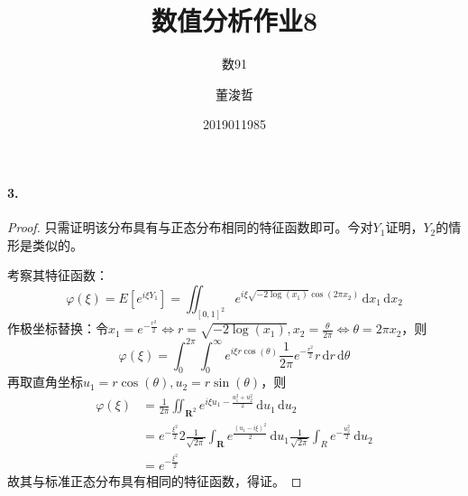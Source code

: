 \documentclass{ctexart}
\title{数值分析作业8}
\author{数91\and 董浚哲\and 2019011985}
\begin{document}
\newcommand{\R}{\mathbf{R}}
\newcommand{\dd}{\,\mathrm{d}}
\newcommand{\st}{\text{ s.t. }}
\newcommand{\pp}[2]{\frac{\partial #1}{\partial #2}}
\newcommand{\nm}[1]{\left\|#1\right\|}

\paragraph{3.}
\begin{proof}
只需证明该分布具有与正态分布相同的特征函数即可。今对$Y_1$证明，$Y_2$的情形是类似的。

考察其特征函数：
\[\varphi(\xi)=E[e^{i\xi Y_1}]=\iint_{[0,1]^2}e^{i\xi\sqrt{-2\log(x_1)}\cos(2\pi x_2)}\dd x_1\dd x_2\]
作极坐标替换：令$x_1=e^{-\frac{r^2}{2}}\Leftrightarrow r=\sqrt{-2\log(x_1)},x_2=\frac{\theta}{2\pi}\Leftrightarrow \theta=2\pi x_2$，则
\[\varphi(\xi)=\int_0^{2\pi}\int_0^\infty e^{i\xi r\cos(\theta)}\frac{1}{2\pi}e^{-\frac{r^2}{2}}   r\dd r\dd \theta\]
再取直角坐标$u_1=r\cos(\theta),u_2=r\sin(\theta)$，则
\begin{align*}
\varphi(\xi)
&=\frac{1}{2\pi}\iint_{\R^2}e^{i\xi u_1-\frac{u_1^2+u_2^2}{2}}\dd u_1\dd u_2\\
&=e^{-\frac{\xi^2}{2}}{2}\frac{1}{\sqrt{2\pi}}\int_\R e^{\frac{(u_1-i\xi)^2}{2}}\dd u_1\frac{1}{\sqrt{2\pi}}\int_R e^{-\frac{u_2^2}{2}}\dd u_2\\
&=e^{-\frac{\xi^2}{2}}
\end{align*}
故其与标准正态分布具有相同的特征函数，得证。
\end{proof}
\end{document}
